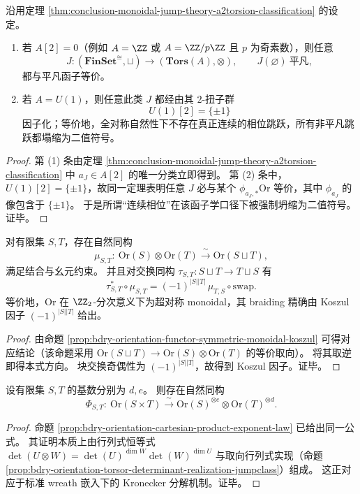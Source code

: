 \begin{corollary}[奇素数阶跳跃与连续相位跳跃的禁制律]\label{cor:conclusion-no-oddprime-or-continuous-phase-monoidal-jump}
沿用定理 \ref{thm:conclusion-monoidal-jump-theory-a2torsion-classification} 的设定。
\begin{enumerate}
  \item 若 \(A[2]=0\)（例如 \(A=\ZZ\) 或 \(A=\ZZ/p\ZZ\) 且 \(p\) 为奇素数），则任意
  \[
  J:(\mathbf{FinSet}^{\cong},\sqcup)\to (\mathbf{Tors}(A),\otimes),
  \qquad
  J(\varnothing)\ \text{平凡},
  \]
  都与平凡函子等价。
  \item 若 \(A=U(1)\)，则任意此类 \(J\) 都经由其 \(2\)-扭子群
  \[
  U(1)[2]=\{\pm 1\}
  \]
  因子化；等价地，全对称自然性下不存在真正连续的相位跳跃，所有非平凡跳跃都塌缩为二值符号。
\end{enumerate}
\end{corollary}
\begin{proof}
第 (1) 条由定理 \ref{thm:conclusion-monoidal-jump-theory-a2torsion-classification} 中 \(a_J\in A[2]\) 的唯一分类立即得到。
第 (2) 条中，\(U(1)[2]=\{\pm1\}\)，故同一定理表明任意 \(J\) 必与某个
\(
\phi_{a_J,\ast}\mathrm{Or}
\)
等价，其中 \(\phi_{a_J}\) 的像包含于 \(\{\pm1\}\)。
于是所谓“连续相位”在该函子学口径下被强制坍缩为二值符号。证毕。
\end{proof}

\begin{theorem}[取向函子在不交并下的超对称单子结构]\label{thm:conclusion-orientation-supermonoidal-koszul}
对有限集 \(S,T\)，存在自然同构
\[
\mu_{S,T}:\ \mathrm{Or}(S)\otimes \mathrm{Or}(T)\xrightarrow{\ \sim\ }\mathrm{Or}(S\sqcup T),
\]
满足结合与幺元约束。
并且对交换同构 \(\tau_{S,T}:S\sqcup T\to T\sqcup S\) 有
\[
\tau_{S,T}^{\ast}\circ \mu_{S,T}
=
(-1)^{|S||T|}\,
\mu_{T,S}\circ \mathrm{swap}.
\]
等价地，\(\mathrm{Or}\) 在 \(\ZZ_2\)-分次意义下为超对称 monoidal，其 braiding 精确由 Koszul 因子 \((-1)^{|S||T|}\) 给出。
\end{theorem}
\begin{proof}
由命题 \ref{prop:bdry-orientation-functor-symmetric-monoidal-koszul} 可得对应结论（该命题采用 \(\mathrm{Or}(S\sqcup T)\to \mathrm{Or}(S)\otimes\mathrm{Or}(T)\) 的等价取向）。
将其取逆即得本式方向。
块交换奇偶性为 \((-1)^{|S||T|}\)，故得到 Koszul 因子。证毕。
\end{proof}

\begin{theorem}\label{thm:conclusion-orientation-cartesian-kronecker}
设有限集 \(S,T\) 的基数分别为 \(d,e\)。
则存在自然同构
\[
\Phi_{S,T}:\ \mathrm{Or}(S\times T)\xrightarrow{\ \sim\ }\mathrm{Or}(S)^{\otimes e}\otimes \mathrm{Or}(T)^{\otimes d}.
\]
\end{theorem}
\begin{proof}
命题 \ref{prop:bdry-orientation-cartesian-product-exponent-law} 已给出同一公式。
其证明本质上由行列式恒等式
\(
\det(U\otimes W)=\det(U)^{\dim W}\det(W)^{\dim U}
\)
与取向行列式实现（命题 \ref{prop:bdry-orientation-torsor-determinant-realization-jumpclass}）组成。
这正对应于标准 wreath 嵌入下的 Kronecker 分解机制。证毕。
\end{proof}

